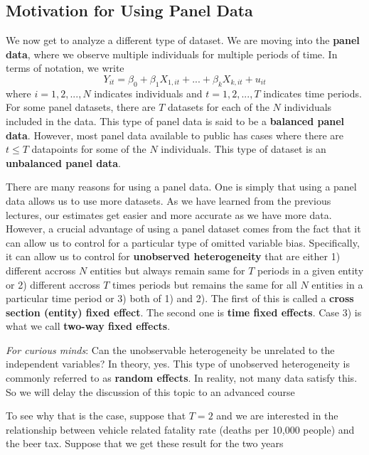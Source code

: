 \documentclass[12pt]{article}
\theoremstyle{definition}
\theoremstyle{property}
\theoremstyle{assumption}
\theoremstyle{example}
\theoremstyle{comment}
\begin{document}
\subsection{Motivation for Using Panel Data}
We now get to analyze a different type of dataset. We are moving into the \textbf{panel data}, where we observe multiple individuals for multiple periods of time. In terms of notation, we write
\[
Y_{it} = \beta_0 + \beta_1X_{1,it}+ ... +\beta_kX_{k,it}+u_{it}
\]
where $i=1,2,...,N$ indicates individuals and $t=1,2,...,T$ indicates time periods. For some panel datasets, there are $T$ datasets for each of the $N$ individuals included in the data. This type of panel data is said to be a \textbf{balanced panel data}. However, most panel data available to public has cases where there are $t\leq T$ datapoints for some of the $N$ individuals. This type of dataset is an \textbf{unbalanced panel data}. \par\medskip
There are many reasons for using a panel data. One is simply that using a panel data allows us to use more datasets. As we have learned from the previous lectures, our estimates get easier and more accurate as we have more data. However, a crucial advantage of using a panel dataset comes from the fact that it can allow us to control for a particular type of omitted variable bias. Specifically, it can allow us to control for \textbf{unobserved heterogeneity} that are either 1) different accross $N$ entities but always remain same for $T$ periods in a given entity or 2) different accross $T$ times periods but remains the same for all $N$ entities in a particular time period or 3) both of 1) and 2). The first of this is called a \textbf{cross section (entity) fixed effect}. The second one is \textbf{time fixed effects}. Case 3) is what we call \textbf{two-way fixed effects}.\par\medskip
\begin{mdframed}[backgroundcolor =blue!10]
\textit{For curious minds}: Can the unobservable heterogeneity be unrelated to the independent variables? In theory, yes. This type of unobserved heterogeneity is commonly referred to as \textbf{random effects}. In reality, not many data satisfy this. So we will delay the discussion of this topic to an advanced course 
\end{mdframed} \par\medskip
To see why that is the case, suppose that $T=2$ and we are interested in the relationship between vehicle related fatality rate (deaths per 10,000 people) and the beer tax. Suppose that we get these result for the two years
\end{document}
